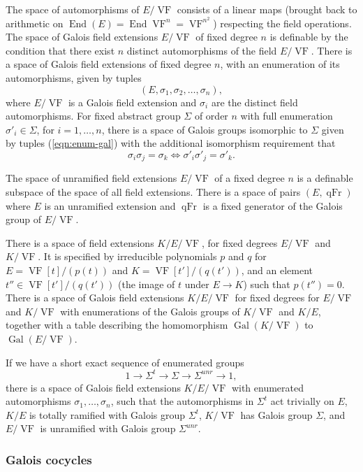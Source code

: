 \documentclass[12pt]{amsart}
\newcommand{\op}[1]{\operatorname{#1}}
\def\VF{{\op{VF}}}
\theoremstyle{plain}
\theoremstyle{definition}
\begin{document}
The space of automorphisms of $E/\VF$ consists of a linear maps
(brought back to arithmetic on $\op{End}(E) = \op{End}{\VF^n} =
\VF^{n^2}$) respecting the field operations.  The space of Galois
field extensions $E/\VF$ of fixed degree $n$ is definable by the
condition that there exist $n$ distinct automorphisms of the field
$E/\VF$.  There is a space of Galois
field extensions of fixed degree $n$, with an enumeration of
its automorphisms, given by tuples
\begin{equation}\label{eqn:enum-gal}
(E,\sigma_1,\sigma_2,\ldots,\sigma_n),
\end{equation}
where $E/\VF$ is a Galois field extension and $\sigma_i$ are the
distinct field automorphisms.  For fixed abstract group $\Sigma$ of
order $n$ with full enumeration $\sigma'_i\in \Sigma$, for
$i=1,\ldots,n$, there is a space of Galois groups isomorphic to
$\Sigma$ given by tuples (\ref{eqn:enum-gal}) with the additional
isomorphism requirement that
\[
\sigma_i\sigma_j = \sigma_k \Longleftrightarrow \sigma'_i\sigma'_j =
\sigma'_k.
\]

The space of unramified field extensions $E/\VF$ of a fixed degree $n$
is a definable subspace of the space of all field extensions.  There
is a space of pairs $(E,\op{qFr})$ where $E$ is an unramified extension
and $\op{qFr}$ is a fixed generator of the Galois group of $E/\VF$.  

There is a space of field extensions $K/E/\VF$, for fixed degrees
$E/\VF$ and $K/\VF$.  It is specified by irreducible polynomials
$p$ and $q$ for $E = \VF[t]/(p(t))$ and $K = \VF[t']/(q(t'))$, and an
element $t''\in \VF[t']/(q(t'))$ (the image of $t$ under $E\to K$) such
that $p(t'') = 0$.  There is a space of Galois field extensions
$K/E/\VF$ for fixed degrees for $E/\VF$ and $K/\VF$ with enumerations
of the Galois groups of $K/\VF$ and $K/E$, together with a table
describing the homomorphism $\op{Gal}(K/\VF)$ to $\op{Gal}(E/\VF)$.

If we have a short exact sequence of enumerated groups 
\[
1 \to \Sigma^t \to \Sigma \to \Sigma^{unr}\to 1,
\]
there is a space of Galois field extensions $K/E/\VF$ with enumerated
automorphisms $\sigma_1,\ldots,\sigma_n$, such that the automorphisms in
$\Sigma^t$ act trivially on $E$, $K/E$ is totally ramified with Galois
group $\Sigma^t$, $K/\VF$ has Galois group $\Sigma$, and $E/\VF$ is
unramified with Galois group $\Sigma^{unr}$.

\subsubsection{Galois cocycles}
\end{document}
